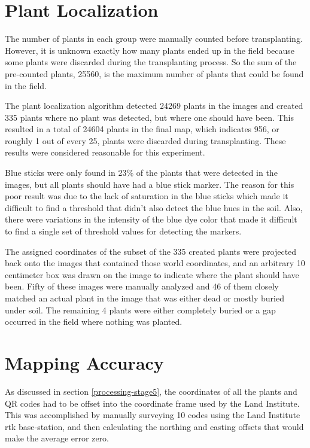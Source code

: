 \section{Plant Localization}
\label{section:plant_localization}

The number of plants in each group were manually counted before transplanting. However, it is unknown exactly how many plants ended up in the field because some plants were discarded during the transplanting process.  So the sum of the pre-counted plants, 25560, is the maximum number of plants that could be found in the field.  

The plant localization algorithm detected 24269 plants in the images and created 335 plants where no plant was detected, but where one should have been.  This resulted in a total of 24604 plants in the final map, which indicates 956, or roughly 1 out of every 25, plants were discarded during transplanting.  These results were considered reasonable for this experiment. 

Blue sticks were only found in 23\% of the plants that were detected in the images, but all plants should have had a blue stick marker.  The reason for this poor result was due to the lack of saturation in the blue sticks which made it difficult to find a threshold that didn't also detect the blue hues in the soil.  Also, there were variations in the intensity of the blue dye color that made it difficult to find a single set of threshold values for detecting the markers.   

The assigned coordinates of the subset of the 335 created plants were projected back onto the images that contained those world coordinates, and an arbitrary 10 centimeter box was drawn on the image to indicate where the plant should have been.  Fifty of these images were manually analyzed and 46 of them closely matched an actual plant in the image that was either dead or mostly buried under soil.  The remaining 4 plants were either completely buried or a gap occurred in the field where nothing was planted.  

\section{Mapping Accuracy}

As discussed in section \ref{processing-stage5}, the coordinates of all the plants and QR codes had to be offset into the coordinate frame used by the Land Institute.  This was accomplished by manually surveying 10 codes using the Land Institute \ac{rtk} base-station, and then calculating the northing and easting offsets that would make the average error zero.  


